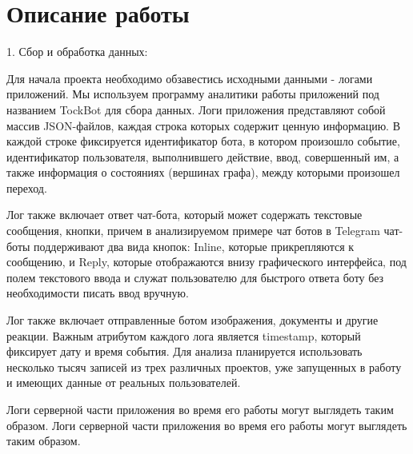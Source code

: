 \documentclass{article}
\begin{document}
\section{Описание работы}
1. Сбор и обработка данных:

Для начала проекта необходимо обзавестись исходными данными - логами приложений. Мы используем программу аналитики работы приложений под названием TockBot для сбора данных. Логи приложения представляют собой массив JSON-файлов, каждая строка которых содержит ценную информацию. В каждой строке фиксируется идентификатор бота, в котором произошло событие, идентификатор пользователя, выполнившего действие, ввод, совершенный им, а также информация о состояниях (вершинах графа), между которыми произошел переход.

Лог также включает ответ чат-бота, который может содержать текстовые сообщения, кнопки, причем в анализируемом примере чат ботов в Telegram чат-боты поддерживают два вида кнопок: Inline, которые прикрепляются к сообщению, и Reply, которые отображаются внизу графического интерфейса, под полем текстового ввода и служат пользователю для быстрого ответа боту без необходимости писать ввод вручную.

Лог также включает отправленные ботом изображения, документы и другие реакции. Важным атрибутом каждого лога является timestamp, который фиксирует дату и время события. Для анализа планируется использовать несколько тысяч записей из трех различных проектов, уже запущенных в работу и имеющих данные от реальных пользователей.

Логи серверной части приложения во время его работы могут выглядеть таким образом.
Логи серверной части приложения во время его работы могут выглядеть таким образом.
\end{document}
